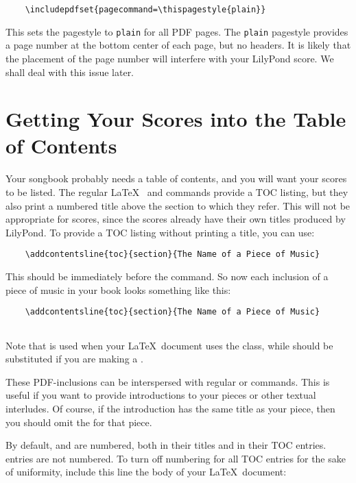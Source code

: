 \documentclass[../../LilyPond-Tutorials]{subfiles}
\begin{document}
\begin{verbatim}
	\includepdfset{pagecommand=\thispagestyle{plain}}
\end{verbatim}

This sets the pagestyle to \texttt{plain} for all PDF pages. 
The \texttt{plain} pagestyle provides a page number at the bottom center of each page, but no headers. 
It is likely that the placement of the page number will interfere with your LilyPond score. 
We shall deal with this issue later.

\section{Getting Your Scores into the Table of Contents}

Your songbook probably needs a table of contents, and you will want your scores to be listed. 
The regular \LaTeX\  and  commands provide a TOC listing, but they also print a numbered title above the section to which they refer. 
This will not be appropriate for scores, since the scores already have their own titles produced by LilyPond. 
To provide a TOC listing without printing a title, you can use: 

\begin{verbatim}
	\addcontentsline{toc}{section}{The Name of a Piece of Music}
\end{verbatim}

This should be immediately before the  command. 
So now each inclusion of a piece of music in your book looks something like this:

\begin{verbatim}
	\addcontentsline{toc}{section}{The Name of a Piece of Music}
	
\end{verbatim}

Note that  is used when your \LaTeX\ document uses the  class, while  should be substituted if you are making a .

These PDF-inclusions can be interspersed with regular  or  commands. 
This is useful if you want to provide introductions to your pieces or other textual interludes. 
Of course, if the introduction has the same title as your piece, then you should omit the  for that piece.

By default,  and  are numbered, both in their titles and in their TOC entries. 
 entries are not numbered. 
To turn off numbering for all TOC entries for the sake of uniformity, include this line the body of your \LaTeX\ document:
\end{document}
